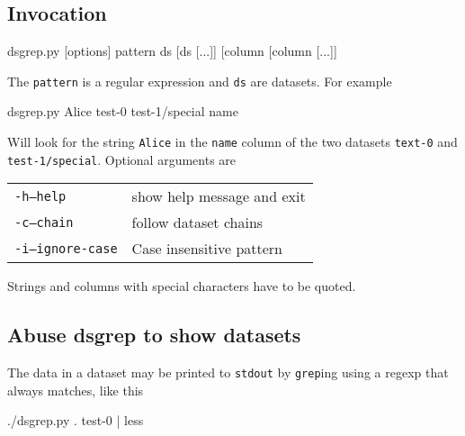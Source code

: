 \subsection{Invocation}
\begin{shell}
dsgrep.py [options] pattern ds [ds [...]] [column [column [...]]
\end{shell}
The \texttt{pattern} is a regular expression and \texttt{ds} are datasets.  For example
\begin{shell}
dsgrep.py Alice test-0 test-1/special name
\end{shell}
Will look for the string \texttt{Alice} in the \texttt{name} column of
the two datasets \texttt{text-0} and \texttt{test-1/special}.
Optional arguments are
\begin{snugshade}
  \begin{tabular}{p{4cm}p{9cm}}
      \texttt{-h}\hspace{3cm}\texttt{--help} & show help message and exit\\[4ex]
      \texttt{-c}\hspace{3cm}\texttt{--chain} & follow dataset chains\\[4ex]
      \texttt{-i}\hspace{3cm}\texttt{--ignore-case} & Case insensitive pattern\\[4ex]
  \end{tabular}
\end{snugshade}
Strings and columns with special characters have to be quoted.

\subsection{Abuse dsgrep to show datasets}
The data in a dataset may be printed to \texttt{stdout} by
\texttt{grep}ing using a regexp that always matches, like this
\begin{shell}
./dsgrep.py . test-0 | less
\end{shell}
